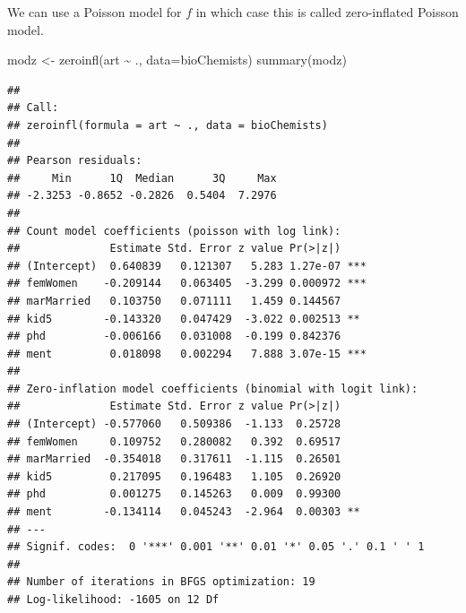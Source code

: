 \documentclass[
  ignorenonframetext,
]{beamer}
\newenvironment{Shaded}{\begin{snugshade}}{\end{snugshade}}
\newcommand{\AttributeTok}[1]{\textcolor[rgb]{0.77,0.63,0.00}{#1}}
\newcommand{\FunctionTok}[1]{\textcolor[rgb]{0.00,0.00,0.00}{#1}}
\newcommand{\NormalTok}[1]{#1}
\newcommand{\OtherTok}[1]{\textcolor[rgb]{0.56,0.35,0.01}{#1}}
\newcommand{\SpecialCharTok}[1]{\textcolor[rgb]{0.00,0.00,0.00}{#1}}
\begin{document}
\begin{frame}[fragile]{}
\protect\hypertarget{section-42}{}
We can use a Poisson model for \(f\) in which case this is called
zero-inflated Poisson model.

\vspace{12pt}
\tiny

\begin{Shaded}
\begin{Highlighting}[]
\NormalTok{modz }\OtherTok{\textless{}{-}} \FunctionTok{zeroinfl}\NormalTok{(art }\SpecialCharTok{\textasciitilde{}}\NormalTok{ ., }\AttributeTok{data=}\NormalTok{bioChemists)}
\FunctionTok{summary}\NormalTok{(modz)}
\end{Highlighting}
\end{Shaded}

\begin{verbatim}
## 
## Call:
## zeroinfl(formula = art ~ ., data = bioChemists)
## 
## Pearson residuals:
##     Min      1Q  Median      3Q     Max 
## -2.3253 -0.8652 -0.2826  0.5404  7.2976 
## 
## Count model coefficients (poisson with log link):
##              Estimate Std. Error z value Pr(>|z|)    
## (Intercept)  0.640839   0.121307   5.283 1.27e-07 ***
## femWomen    -0.209144   0.063405  -3.299 0.000972 ***
## marMarried   0.103750   0.071111   1.459 0.144567    
## kid5        -0.143320   0.047429  -3.022 0.002513 ** 
## phd         -0.006166   0.031008  -0.199 0.842376    
## ment         0.018098   0.002294   7.888 3.07e-15 ***
## 
## Zero-inflation model coefficients (binomial with logit link):
##              Estimate Std. Error z value Pr(>|z|)   
## (Intercept) -0.577060   0.509386  -1.133  0.25728   
## femWomen     0.109752   0.280082   0.392  0.69517   
## marMarried  -0.354018   0.317611  -1.115  0.26501   
## kid5         0.217095   0.196483   1.105  0.26920   
## phd          0.001275   0.145263   0.009  0.99300   
## ment        -0.134114   0.045243  -2.964  0.00303 **
## ---
## Signif. codes:  0 '***' 0.001 '**' 0.01 '*' 0.05 '.' 0.1 ' ' 1 
## 
## Number of iterations in BFGS optimization: 19 
## Log-likelihood: -1605 on 12 Df
\end{verbatim}
\end{frame}
\end{document}
